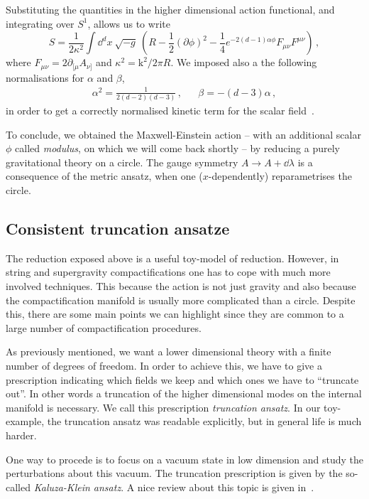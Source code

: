 \documentclass[debug]{phd}
\begin{document}
			Substituting the quantities in the higher dimensional action functional, and integrating over $S^1$, allows us to write
					\begin{equation*}
						S = \frac{1}{2 \kappa^2} \int \dd^{d}x\ \sqrt{-g}\ \left(R - \frac{1}{2} (\partial \phi)^2 - \frac{1}{4} e^{-2(d-1) \alpha \phi} F_{\mu\nu}F^{\mu\nu} \right)\, ,
					\end{equation*}
			where $F_{\mu\nu} = 2 \partial_{[\mu} A_{\nu]}$ and $\kappa^2 = \mathrm{k}^2/ 2\pi R$.
			We imposed also a the following normalisations for $\alpha$ and $\beta$,
					\begin{align*}
						&& \alpha^2 = \frac{1}{2(d-2)(d-3)} \, , & & \beta = - (d-3) \alpha \, ,& &
					\end{align*}
			in order to get a correctly normalised kinetic term for the scalar field~\cite{popeKK}.
			
			To conclude, we obtained the Maxwell-Einstein action -- with an additional scalar $\phi$ called \emph{modulus}, on which we will come back shortly -- by reducing a purely gravitational theory on a circle.
			The gauge symmetry $A \rightarrow A + \dd \lambda$ is a consequence of the metric ansatz, when one ($x$-dependently) reparametrises the circle.
			\subsection{Consistent truncation ansatze}
				The reduction exposed above is a useful toy-model of reduction.
				However, in string and supergravity compactifications one has to cope with much more involved techniques.
				This because the action is not just gravity and also because the compactification manifold is usually more complicated than a circle.
				Despite this, there are some main points we can highlight since they are common to a large number of compactification procedures.
			
				As previously mentioned, we want a lower dimensional theory with a finite number of degrees of freedom.
				In order to achieve this, we have to give a prescription indicating which fields we keep and which ones we have to ``truncate out''.
				In other words a truncation of the higher dimensional modes on the internal manifold is necessary.
				We call this prescription \emph{truncation ansatz}.
				In our toy-example, the truncation ansatz was readable explicitly, but in general life is much harder.
			
				One way to procede is to focus on a vacuum state in low dimension and study the perturbations about this vacuum.
				The truncation prescription is given by the so-called \emph{Kaluza-Klein ansatz}.
				A nice review about this topic is given in~\cite{duffKK}.
			
\end{document}
